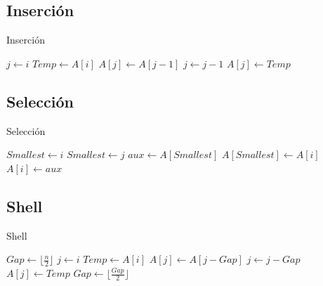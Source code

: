 \documentclass[12pt, fleqn]{report}                             %
\theoremstyle{break}                                            %
\begin{document}
		\subsection{Inserción}
            \begin{algorithm}[H]
            \caption{Inserción}
            \begin{algorithmic}[1]
                    \State $j \gets i$
                    \State $Temp \gets A[i]$
                        \State $A[j] \gets A[j - 1]$
                        \State $j \gets j - 1$
                    \EndWhile
                    \State $A[j] \gets Temp$
                \EndFor
                \EndProcedure
                \end{algorithmic}
            \end{algorithm}
            
		\subsection{Selección}
            \begin{algorithm}[H]
            \caption{Selección}
            \begin{algorithmic}[1]
                    \State $Smallest \gets i$
                            \State $Smallest \gets j$
                        \EndIf
                    \EndFor
                    \State $aux \gets A[Smallest]$
                    \State $A[Smallest] \gets A[i]$
                    \State $A[i] \gets aux$
                \EndFor
                \EndProcedure
                \end{algorithmic}
            \end{algorithm}
            
		\subsection{Shell}
            \begin{algorithm}[H]
            \caption{Shell}
            \begin{algorithmic}[1]
                \State $Gap \gets \lfloor \frac{n}{2} \rfloor$
                        \State $j \gets i$
                        \State $Temp \gets A[i]$
                            \State $A[j] \gets A[j - Gap]$
                            \State $j \gets j - Gap$
                        \EndWhile
                        \State $A[j] \gets Temp$
                    \EndFor
                    \State $Gap \gets \lfloor \frac{Gap}{2} \rfloor$
                \EndWhile
                \EndProcedure
                \end{algorithmic}
            \end{algorithm}
            
\end{document}
